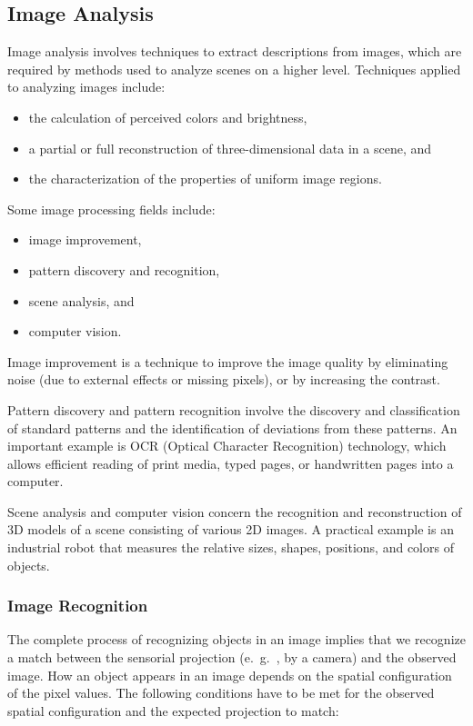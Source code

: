 \subsection{Image Analysis}
Image analysis involves techniques to extract descriptions from images, which are required by methods used to analyze scenes on a higher level. Techniques applied to analyzing images include:
\begin{itemize}
	\item the calculation of perceived colors and brightness, 
	\item a partial or full reconstruction of three-dimensional data in a scene, and 
	\item the characterization of the properties of uniform image regions.
	
\end{itemize}


Some image processing fields include:
\begin{multicols}{2}
	\begin{itemize}
		\item image improvement, 
		\item pattern discovery and recognition, 
		\item scene analysis, and 
		\item computer vision.
	\end{itemize}
\end{multicols}
 

Image improvement is a technique to improve the image quality by eliminating noise (due to external effects or missing pixels), or by increasing the contrast.

Pattern discovery and pattern recognition involve the discovery and classification of standard patterns and the identification of deviations from these patterns. An important example is OCR (Optical Character Recognition) technology, which allows efficient reading of print media, typed pages, or handwritten pages into a computer. 

Scene analysis and computer vision concern the recognition and reconstruction of 3D models of a scene consisting of various 2D images. A practical example is an industrial robot that measures the relative sizes, shapes, positions, and colors of objects.

\subsubsection{Image Recognition}
The complete process of recognizing objects in an image implies that we recognize a match between the sensorial projection (e.\ g.\ , by a camera) and the observed image. How an object appears in an image depends on the spatial configuration of the pixel values. The following conditions have to be met for the observed spatial configuration and the expected projection to match:

